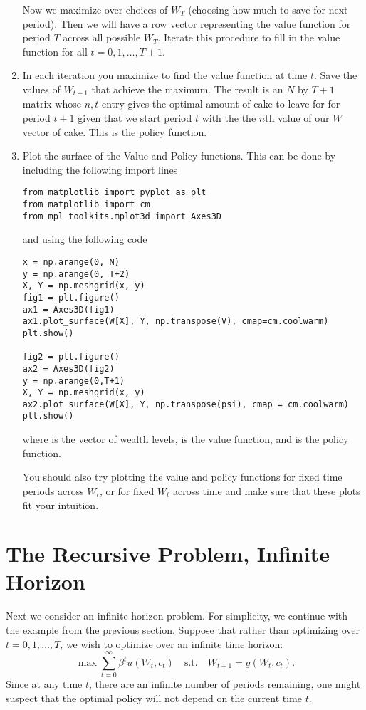 \begin{problem}
\begin{enumerate}
Now we maximize over choices of $W_T$ (choosing how much to save for next period).  Then we will have a row vector representing the value function for period $T$ across all possible $W_T$.  Iterate this procedure to fill in the value function for all $t=0,1,\ldots, T+1$.

\item In each iteration you maximize to find the value function at time $t$.  Save the values of $W_{t+1}$ that achieve the maximum.  The result is an $N$ by $T+1$ matrix whose $n,t$ entry gives the optimal amount of cake to leave for for period $t+1$ given that we start period $t$ with the the $n$th value of our $W$ vector of cake.  This is the policy function.

\item Plot the surface of the Value and Policy functions.  This can be done by including the following import lines
\begin{lstlisting}
from matplotlib import pyplot as plt
from matplotlib import cm
from mpl_toolkits.mplot3d import Axes3D
\end{lstlisting}
and using the following code
\begin{lstlisting}
x = np.arange(0, N)
y = np.arange(0, T+2)
X, Y = np.meshgrid(x, y)
fig1 = plt.figure()
ax1 = Axes3D(fig1)
ax1.plot_surface(W[X], Y, np.transpose(V), cmap=cm.coolwarm)
plt.show()

fig2 = plt.figure()
ax2 = Axes3D(fig2)
y = np.arange(0,T+1)
X, Y = np.meshgrid(x, y)
ax2.plot_surface(W[X], Y, np.transpose(psi), cmap = cm.coolwarm)
plt.show()
\end{lstlisting}
where  is the vector of wealth levels,  is the value function, and  is the policy function.

You should also try plotting the value and policy functions for fixed time periods across $W_t$, or for fixed $W_t$ across time and make sure that these plots fit your intuition.
\end{enumerate}
\end{problem}

\section*{The Recursive Problem, Infinite Horizon}
\label{SecRecProbInFHor}
Next we consider an infinite horizon problem.  For simplicity, we continue with the example from the previous section.  Suppose that rather than optimizing over $t = 0,1,\ldots,T$, we wish to optimize over an infinite time horizon:
\begin{equation*}
\max \sum_{t=0}^\infty \beta^t u(W_t,c_t) \quad \text{s.t.} \quad W_{t+1} = g(W_t,c_t).
\end{equation*}
Since at any time $t$, there are an infinite number of periods remaining, one might suspect that the optimal policy will not depend on the current time $t$.

